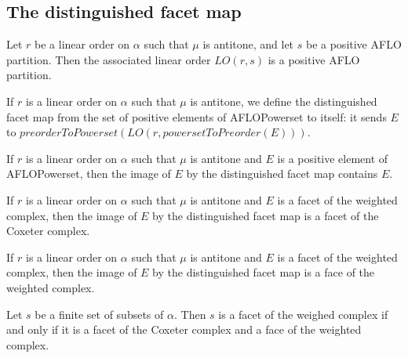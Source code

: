 \subsection{The distinguished facet map}

\begin{sublemma}
Let $r$ be a linear order on $\alpha$ such that $\mu$ is antitone, and let $s$ be a positive AFLO partition. Then the associated linear order
$LO(r,s)$ is a positive AFLO partition.

\end{sublemma}

\begin{subdefi}
If $r$ is a linear order on $\alpha$ such that $\mu$ is antitone, we define the distinguished facet map from the set of positive elements of 
AFLOPowerset to itself: it sends $E$ to $preorderToPowerset(LO(r,powersetToPreorder(E)))$.
    
\end{subdefi}

\begin{sublemma}
If $r$ is a linear order on $\alpha$ such that $\mu$ is antitone and $E$ is a positive element of AFLOPowerset, then the image of $E$ by the 
distinguished facet map contains $E$.

\end{sublemma}

\begin{sublemma}
If $r$ is a linear order on $\alpha$ such that $\mu$ is antitone and $E$ is a facet of the weighted complex, then the image of $E$ by
the distinguished facet map is a facet of the Coxeter complex.

\end{sublemma}

\begin{sublemma}
If $r$ is a linear order on $\alpha$ such that $\mu$ is antitone and $E$ is a facet of the weighted complex, then the image of $E$ by
the distinguished facet map is a face of the weighted complex.

\end{sublemma}

\begin{sublemma}
Let $s$ be a finite set of subsets of $\alpha$. Then $s$ is a facet of the weighed complex if and only if it is a facet of the Coxeter complex
and a face of the weighted complex.

\end{sublemma}

